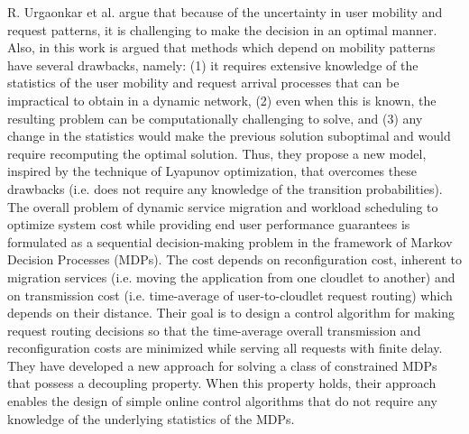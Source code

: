 \noindent\tab R. Urgaonkar et al. \cite{urgaonkar2015dynamic} argue that because of the uncertainty in user mobility and request patterns, it is challenging to make the decision in an optimal manner. Also, in this work is argued that methods which depend on mobility patterns have several drawbacks, namely: (1) it requires extensive knowledge of the statistics of the user mobility and request arrival processes that can be impractical to obtain in a dynamic network, (2) even when this is known, the resulting problem can be computationally challenging to solve, and (3) any change in the statistics would make the previous solution suboptimal and would require recomputing the optimal solution. Thus, they propose a new model, inspired by the technique of Lyapunov optimization, that overcomes these drawbacks (i.e. does not require any knowledge of the transition probabilities). The overall problem of dynamic service migration and workload scheduling to optimize system cost while providing end user performance guarantees is formulated as a sequential decision-making problem in the framework of Markov Decision Processes (MDPs). The cost depends on reconfiguration cost, inherent to migration services (i.e. moving the application from one cloudlet to another) and on transmission cost (i.e. time-average of user-to-cloudlet request routing) which depends on their distance. Their goal is to design a control algorithm for making request routing decisions so that the time-average overall transmission and reconfiguration costs are minimized while serving all requests with finite delay. They have developed a new approach for solving a class of constrained MDPs that possess a decoupling property. When this property holds, their approach enables the design of simple online control algorithms that do not require any knowledge of the underlying statistics of the MDPs.


